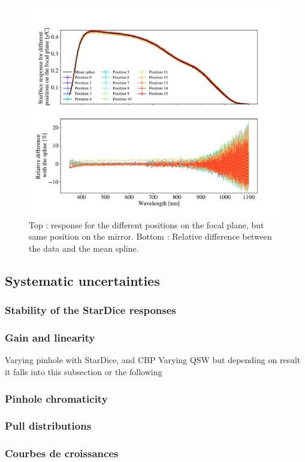 \begin{figure}[h]
    \centering
    \includegraphics[width=\columnwidth]{fig/ccd_positions.pdf}
    \caption{Top : \SD response for the different positions on the focal plane, but same position on the mirror. Bottom : Relative difference between the data and the mean spline.}
    \label{fig:ccd_positions}
\end{figure}

\subsection{Systematic uncertainties}
\label{sec:systematics}

\subsubsection{Stability of the StarDice responses}

\subsubsection{Gain and linearity}
\label{sec:gain}

Varying pinhole with StarDice, and CBP
Varying QSW but depending on result it falls into this subsection or the following

\subsubsection{Pinhole chromaticity}

\subsubsection{Pull distributions}

\subsubsection{Courbes de croissances}




